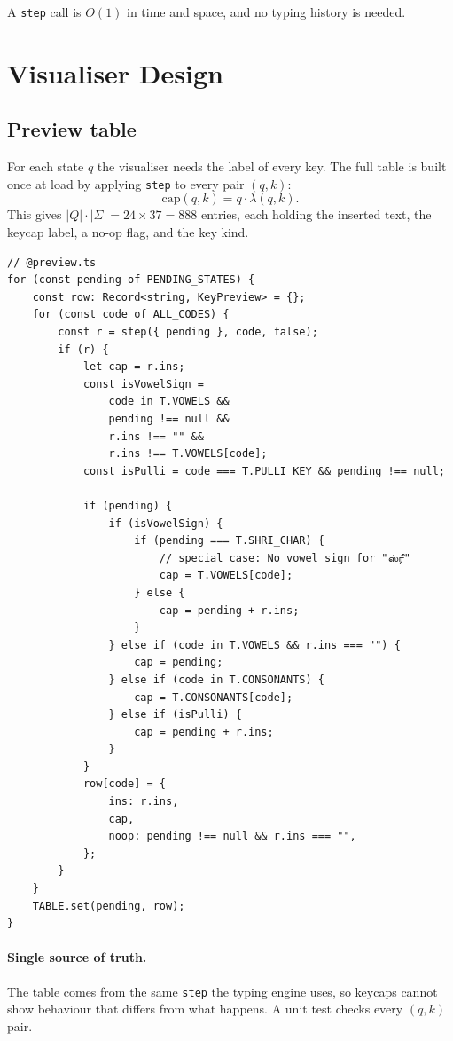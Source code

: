 \documentclass[11pt,a4paper]{article}
\begin{document}
A \texttt{step} call is $O(1)$ in time and space, and no typing history is
needed.

\section{Visualiser Design}
\subsection{Preview table}
For each state $q$ the visualiser needs the label of every key. The full table
is built once at load by applying \texttt{step} to every pair $(q,k)$:
\[
  \text{cap}(q,k)=q\cdot\lambda(q,k).
\]
This gives $|Q|\cdot|\Sigma|=24\times37=888$ entries, each holding the inserted
text, the keycap label, a no-op flag, and the key kind.

\begin{lstlisting}
// @preview.ts
for (const pending of PENDING_STATES) {
	const row: Record<string, KeyPreview> = {};
	for (const code of ALL_CODES) {
		const r = step({ pending }, code, false);
		if (r) {
			let cap = r.ins;
			const isVowelSign =
				code in T.VOWELS &&
				pending !== null &&
				r.ins !== "" &&
				r.ins !== T.VOWELS[code];
			const isPulli = code === T.PULLI_KEY && pending !== null;

			if (pending) {
				if (isVowelSign) {
					if (pending === T.SHRI_CHAR) {
						// special case: No vowel sign for "ஸ்ரீ"
						cap = T.VOWELS[code];
					} else {
						cap = pending + r.ins;
					}
				} else if (code in T.VOWELS && r.ins === "") {
					cap = pending;
				} else if (code in T.CONSONANTS) {
					cap = T.CONSONANTS[code];
				} else if (isPulli) {
					cap = pending + r.ins;
				}
			}
			row[code] = {
				ins: r.ins,
				cap,
				noop: pending !== null && r.ins === "",
			};
		}
	}
	TABLE.set(pending, row);
}
\end{lstlisting}

\paragraph{Single source of truth.}
The table comes from the same \texttt{step} the typing engine uses, so keycaps
cannot show behaviour that differs from what happens. A unit test checks every
$(q,k)$ pair.
\end{document}
